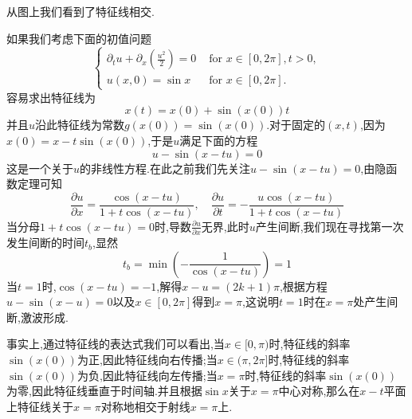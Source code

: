 从图上我们看到了特征线相交.\par
如果我们考虑下面的初值问题
$$
\left\{  \begin{array}{ll} {\partial }_{t}u + {\partial }_{x}\left( \frac{{u}^{2}}{2}\right)  = 0 & \text{ for }x \in  \left\lbrack  {0,{2\pi }}\right\rbrack  ,t > 0, \\  u\left( {x,0}\right)  = \sin x & \text{ for }x \in  \left\lbrack  {0,{2\pi }}\right\rbrack  . \end{array}\right.
$$
\qquad 容易求出特征线为
$$
x(t)=x(0)+\sin(x(0))t
$$
并且$u$沿此特征线为常数$g(x(0))=\sin(x(0))$.对于固定的$(x,t)$,因为$x(0)=x-t\sin(x(0))$,于是$u$满足下面的方程
$$
u-\sin(x-tu)=0
$$
这是一个关于$u$的非线性方程.在此之前我们先关注$u-\sin(x-tu)=0$,由隐函数定理可知
$$
\frac{\partial u}{\partial x} = \frac{\cos(x-tu)}{1+t\cos(x-tu)},\quad \frac{\partial u}{\partial t} = -\frac{u\cos(x-tu)}{1+t\cos(x-tu)}
$$
当分母$1+t\cos(x-tu)=0$时,导数$\frac{\partial u}{\partial x}$无界,此时$u$产生间断,我们现在寻找第一次发生间断的时间$t_b$,显然
$$
t_b=\min\left(-\frac{1}{\cos(x-tu)}\right)=1
$$
当$t=1$时,$\cos(x-tu)=-1$,解得$x-u=(2k+1)\pi$,根据方程$u-\sin(x-u)=0$以及$x\in [0,2\pi]$得到$x=\pi$,这说明$t=1$时在$x=\pi$处产生间断,激波形成.\par
事实上,通过特征线的表达式我们可以看出,当$x\in [0,\pi)$时,特征线的斜率$\sin(x(0))$为正,因此特征线向右传播;当$x\in (\pi,2\pi]$时,特征线的斜率$\sin(x(0))$为负,因此特征线向左传播;当$x=\pi$时,特征线的斜率$\sin(x(0))$为零,因此特征线垂直于时间轴.并且根据$\sin x$关于$x=\pi$中心对称,那么在$x-t$平面上特征线关于$x=\pi$对称地相交于射线$x=\pi$上.\par

